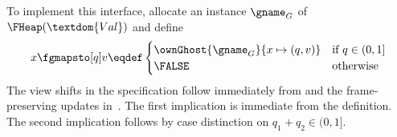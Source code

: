 To implement this interface, allocate an instance $\gname_G$ of $\FHeap(\textdom{Val})$ and define
\[
	x \fgmapsto[q] v \eqdef
	  \begin{cases}
    	\ownGhost{\gname_G}{x \mapsto (q, v)} & \text{if $q \in (0, 1]$} \\
    	\FALSE & \text{otherwise}
    \end{cases}
\]
The view shifts in the specification follow immediately from  and the frame-preserving updates in~.
The first implication is immediate from the definition.
The second implication follows by case distinction on $q_1 + q_2 \in (0, 1]$.

